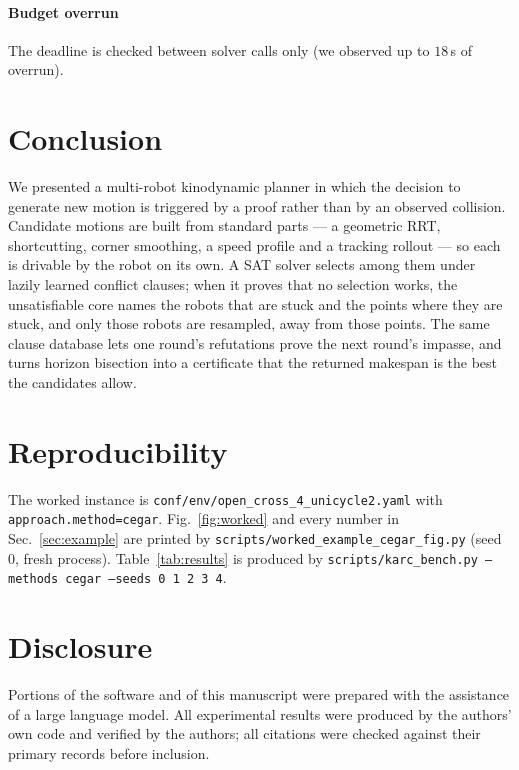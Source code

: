 \documentclass[conference]{IEEEtran}
\theoremstyle{plain}
\theoremstyle{definition}
\begin{document}
\paragraph*{Budget overrun}
The deadline is checked between solver calls only (we observed up to $18$\,s of overrun).

\section{Conclusion}

We presented a multi-robot kinodynamic planner in which the decision to generate new motion is
triggered by a proof rather than by an observed collision. Candidate motions are built from
standard parts --- a geometric RRT, shortcutting, corner smoothing, a speed profile and a
tracking rollout --- so each is drivable by the robot on its own. A SAT solver selects among
them under lazily learned conflict clauses; when it proves that no selection works, the
unsatisfiable core names the robots that are stuck and the points where they are stuck, and
only those robots are resampled, away from those points. The same clause database lets one
round's refutations prove the next round's impasse, and turns horizon bisection into a
certificate that the returned makespan is the best the candidates allow.

\section*{Reproducibility}

The worked instance is \texttt{conf/env/open\_cross\_4\_unicycle2.yaml} with
\texttt{approach.method=cegar}. Fig.~\ref{fig:worked} and every number in
Sec.~\ref{sec:example} are printed by \texttt{scripts/worked\_example\_cegar\_fig.py} (seed
$0$, fresh process). Table~\ref{tab:results} is produced by \texttt{scripts/karc\_bench.py
--methods cegar --seeds 0 1 2 3 4}.

\section*{Disclosure}

Portions of the software and of this manuscript were prepared with the assistance of a large
language model. All experimental results were produced by the authors' own code and verified by
the authors; all citations were checked against their primary records before inclusion.



\end{document}

